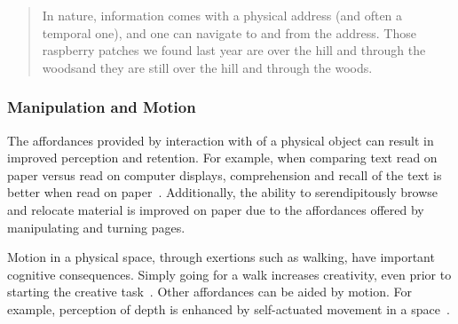 \documentclass[conference]{IEEEtran}
\begin{document}
\begin{quote}
In nature, information comes with a physical address (and often a temporal one), and one can navigate to and from the address. Those raspberry patches we found last year are over the hill and through the woods\textemdash and they are still over the hill and through the woods.
\end{quote}




\subsubsection{Manipulation and Motion}

The affordances provided by interaction with of a physical object can result in improved perception and retention. 
For example, when comparing text read on paper versus read on computer displays, 
comprehension and recall of the text is better when read on paper~\cite{}.  
Additionally, the ability to serendipitously browse and relocate material is improved on paper due to the affordances offered by manipulating and turning pages.

Motion in a physical space, through exertions such as walking, have important cognitive consequences.
Simply going for a walk increases creativity, even prior to starting the creative task~\cite{Oppezzo:2014}.
Other affordances can be aided by motion. For example, perception of depth is enhanced by self-actuated movement in a space~\cite{HeldAndHein}.
\end{document}
